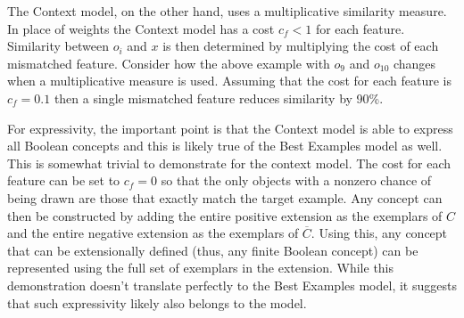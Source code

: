 \documentclass[doc,floatsintext]{apa6}
\begin{document}
The Context model, on the other hand, uses a multiplicative similarity measure.
In place of weights the Context model has a cost $c_f < 1$ for each feature.
Similarity between $o_i$ and $x$ is then determined by multiplying the cost of each mismatched feature.
Consider how the above example with $o_9$ and $o_10$ changes when a multiplicative measure is used.
Assuming that the cost for each feature is $c_f = 0.1$ then a single mismatched feature reduces similarity by 90\%.

For expressivity, the important point is that the Context model is able to express all Boolean concepts and this is likely true of the Best Examples model as well.
This is somewhat trivial to demonstrate for the context model.
The cost for each feature can be set to $c_f=0$ so that the only objects with a nonzero chance of being drawn are those that exactly match the target example.
Any concept can then be constructed by adding the entire positive extension as the exemplars of $C$ and the entire negative extension as the exemplars of $\overline{C}$.
Using this, any concept that can be extensionally defined (thus, any finite Boolean concept) can be represented using the full set of exemplars in the extension.
While this demonstration doesn't translate perfectly to the Best Examples model, it suggests that such expressivity likely also belongs to the model.




\end{document}
